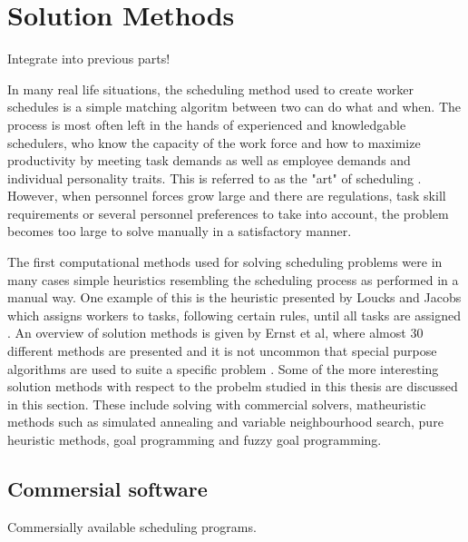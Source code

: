 \section{Solution Methods}
Integrate into previous parts!


In many real life situations, the scheduling method used to create worker schedules is a simple matching algoritm between two can do what and when. The process is most often left in the hands of experienced and knowledgable schedulers, who know the capacity of the work force and how to maximize productivity by meeting task demands as well as employee demands and individual personality traits. This is referred to as the "art" of scheduling \citet{roberts_1983}. However, when personnel forces grow large and there are regulations, task skill requirements or several personnel preferences to take into account, the problem becomes too large to solve manually in a satisfactory manner.

The first computational methods used for solving scheduling problems were in many cases simple heuristics resembling the scheduling process as performed in a manual way. One example of this is the heuristic presented by Loucks and Jacobs which assigns workers to tasks, following certain rules, until all tasks are assigned \citet{loucks_1991}. An overview of solution methods is given by Ernst et al, where almost 30 different methods are presented  and it is not uncommon that special purpose algorithms are used to suite a specific problem \citet{ernst_2004}. Some of the more interesting solution methods with respect to the probelm studied in this thesis are discussed in this section. These include solving with commercial solvers, matheuristic methods such as simulated annealing and variable neighbourhood search, pure heuristic methods, goal programming and fuzzy goal programming.  



\subsection{Commersial software}

Commersially available scheduling programs.

